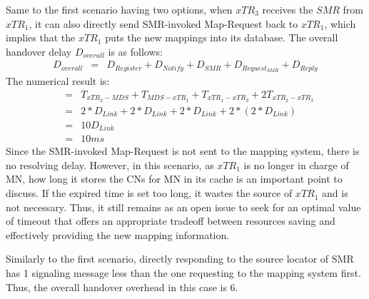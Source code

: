 Same to the first scenario having two options, when $xTR_3$ receives the $SMR$ from $xTR_1$, it can also directly send SMR-invoked Map-Request back to $xTR_1$, which implies that the $xTR_1$ puts the new mappings into its database. The overall handover delay $D_{overall}$ is as follows:
\begin{eqnarray}
D_{overall} &=& D_{Register} + D_{Notify} + D_{SMR} + D_{Request_{SMR}} + D_{Reply}
\end{eqnarray}
The numerical result is:
\begin{eqnarray}
&=& T_{xTR_2-MDS} + T_{MDS-xTR_1} + T_{xTR_1-xTR_3} + 2T_{xTR_2-xTR_3} \nonumber \\
&=& 2*D_{Link} + 2*D_{Link} + 2*D_{Link} + 2*(2*D_{Link}) \nonumber \\
&=& 10D_{Link}  \nonumber \\
&=& 10 ms \nonumber
\end{eqnarray}
Since the SMR-invoked Map-Request is not sent to the mapping system, there is no resolving delay. %
However, in this scenario, as $xTR_1$ is no longer in charge of MN, how long it stores the CNs for MN in its cache is an important point to discuss. If the expired time is set too long, it wastes the source of $xTR_1$ and is not necessary. %
Thus, it still remains as an open issue to seek for an optimal value of timeout that offers an appropriate tradeoff between resources saving and effectively providing the new mapping information.

Similarly to the first scenario, directly responding to the source locator of SMR has 1 signaling message less than the one requesting to the mapping system first. Thus, the overall handover overhead in this case is 6.

